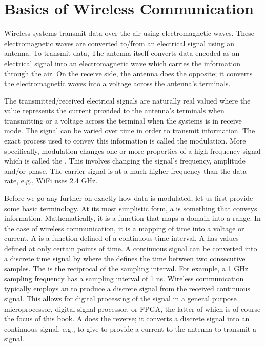 \chapter{Basics of Wireless Communication}
\glsresetall
\label{chap:Wireless}

Wireless systems transmit data over the air using electromagnetic waves. These electromagnetic waves are converted to/from an electrical signal using an antenna. To transmit data, The antenna itself converts data encoded as an electrical signal into an electromagnetic wave which carries the information through the air. On the receive side, the antenna does the opposite; it converts the electromagnetic waves into a voltage across the antenna's terminals. 

The transmitted/received electrical signals are naturally real valued where the value represents the current provided to the antenna's terminals when transmitting or a voltage across the terminal when the systems is in receive mode. The signal can be varied over time in order to transmit information. The exact process used to convey this information is called the modulation. More specifically, modulation changes one or more properties of a high frequency signal which is called the . This involves changing the signal's frequency, amplitude and/or phase. The carrier signal is at a much higher frequency than the data rate, e.g., WiFi uses 2.4 GHz.

Before we go any further on exactly how data is modulated, let us first provide some basic terminology. At its most simplistic form, a  is something that conveys information. Mathematically, it is a function that maps a domain into a range. In the case of wireless communication, it is a mapping of time into a voltage or current. A  is a function defined of a continuous time interval.  A  has values defined at only certain points of time. A continuous signal can be converted into a discrete time signal by  where the  defines the time between two consecutive samples. The  is the reciprocal of the sampling interval.  For example, a 1 GHz sampling frequency has a sampling interval of 1 ns. Wireless communication typically employs an  to produce a discrete signal from the received continuous signal. This allows for digital processing of the signal in a general purpose microprocessor, digital signal processor, or FPGA, the latter of which is of course the focus of this book. A  does the reverse; it converts a discrete signal into an continuous signal, e.g., to give to provide a current to the antenna to transmit a signal. 

